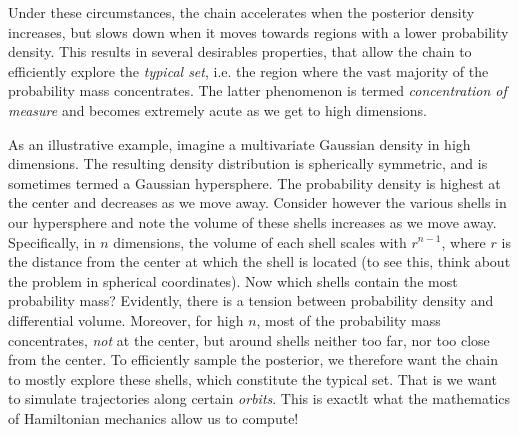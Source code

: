 \documentclass[11pt]{article}
\begin{document}
  Under these circumstances, the chain accelerates when the posterior density increases,
  but slows down when it moves towards regions with a lower probability density.
  This results in several desirables properties, that allow the chain
  to efficiently explore the \textit{typical set}, i.e. the region where the vast majority of the probability
  mass concentrates.
  The latter phenomenon is termed \textit{concentration of measure} and becomes extremely acute
  as we get to high dimensions.
  
  As an illustrative example, imagine a multivariate Gaussian density in high dimensions. 
  The resulting density distribution is spherically symmetric, and is sometimes termed a Gaussian
  hypersphere.
  The probability density is highest at the center and decreases as we move away.
  Consider however the various shells in our hypersphere and
  note the volume of these shells increases as we move away.
  Specifically, in $n$ dimensions, the volume of each shell scales with $r^{n-1}$, where $r$ is the distance
  from the center at which the shell is located (to see this, think about the problem in spherical coordinates).
  Now which shells contain the most probability mass? 
  Evidently, there is a tension between probability density and differential volume. 
  Moreover, for high $n$, most of the probability mass concentrates, \textit{not} at the center,
  but around shells neither too far, nor too close from the center.
  To efficiently sample the posterior, we therefore want the chain to mostly explore these shells,
  which constitute the typical set.
  That is we want to simulate trajectories along certain \textit{orbits}.
  This is exactlt what the mathematics of Hamiltonian mechanics allow us to compute!

  
\end{document}
